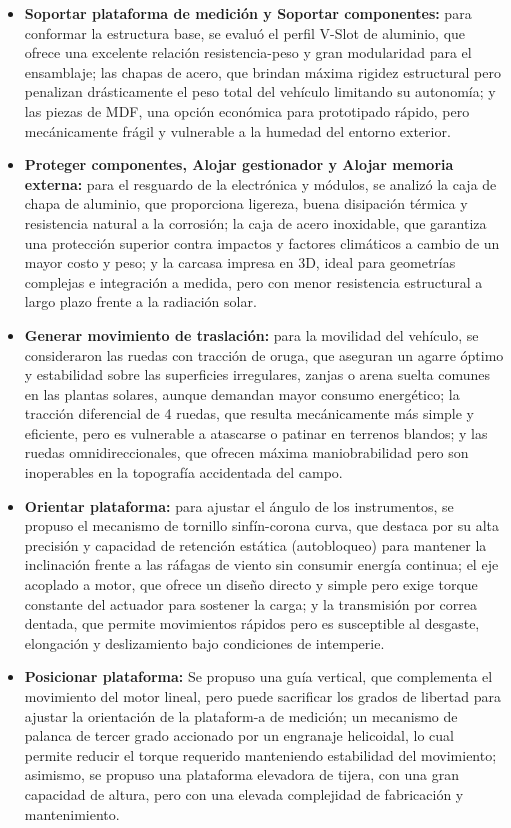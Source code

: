 \documentclass[../../General.tex]{subfiles}
\begin{document}
\begin{itemize}
	\item \textbf{Soportar plataforma de medición y Soportar componentes:} para conformar la estructura base, se evaluó el perfil V-Slot de aluminio, que ofrece una excelente relación resistencia-peso y gran modularidad para el ensamblaje; las chapas de acero, que brindan máxima rigidez estructural pero penalizan drásticamente el peso total del vehículo limitando su autonomía; y las piezas de MDF, una opción económica para prototipado rápido, pero mecánicamente frágil y vulnerable a la humedad del entorno exterior.
	
	\item \textbf{Proteger componentes, Alojar gestionador y Alojar memoria externa:} para el resguardo de la electrónica y módulos, se analizó la caja de chapa de aluminio, que proporciona ligereza, buena disipación térmica y resistencia natural a la corrosión; la caja de acero inoxidable, que garantiza una protección superior contra impactos y factores climáticos a cambio de un mayor costo y peso; y la carcasa impresa en 3D, ideal para geometrías complejas e integración a medida, pero con menor resistencia estructural a largo plazo frente a la radiación solar.
	
	\item \textbf{Generar movimiento de traslación:} para la movilidad del vehículo, se consideraron las ruedas con tracción de oruga, que aseguran un agarre óptimo y estabilidad sobre las superficies irregulares, zanjas o arena suelta comunes en las plantas solares, aunque demandan mayor consumo energético; la tracción diferencial de 4 ruedas, que resulta mecánicamente más simple y eficiente, pero es vulnerable a atascarse o patinar en terrenos blandos; y las ruedas omnidireccionales, que ofrecen máxima maniobrabilidad pero son inoperables en la topografía accidentada del campo.
	
	\item \textbf{Orientar plataforma:} para ajustar el ángulo de los instrumentos, se propuso el mecanismo de tornillo sinfín-corona curva, que destaca por su alta precisión y capacidad de retención estática (autobloqueo) para mantener la inclinación frente a las ráfagas de viento sin consumir energía continua; el eje acoplado a motor, que ofrece un diseño directo y simple pero exige torque constante del actuador para sostener la carga; y la transmisión por correa dentada, que permite movimientos rápidos pero es susceptible al desgaste, elongación y deslizamiento bajo condiciones de intemperie.
	
	 \item \textbf{Posicionar plataforma:} Se propuso una guía vertical, que complementa el movimiento del motor lineal, pero puede sacrificar los grados de libertad para ajustar la orientación de la plataform-a de medición; un mecanismo de palanca de tercer grado accionado por un engranaje helicoidal, lo cual permite reducir el torque requerido manteniendo estabilidad del movimiento; asimismo, se propuso una plataforma elevadora de tijera, con una gran capacidad de altura, pero con una elevada complejidad de fabricación y mantenimiento.

\end{itemize}
\end{document}
